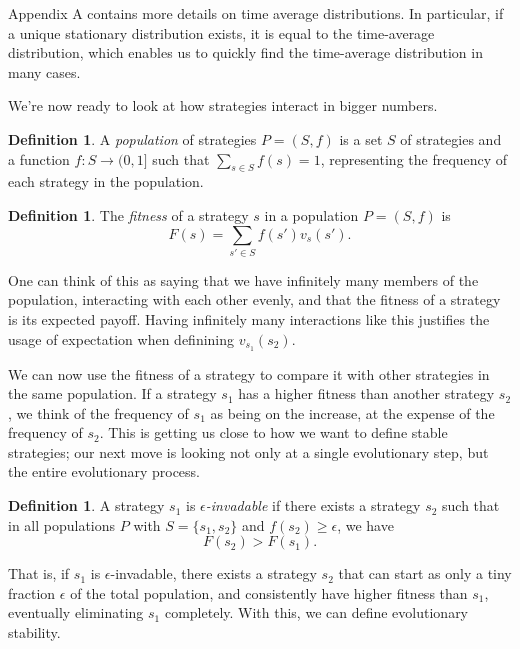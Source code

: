 \documentclass[12pt]{article}
\theoremstyle{definition}
\newtheorem{definition}[theorem]{Definition}
\theoremstyle{remark}
\begin{document}
Appendix A contains more details on time average distributions. In particular, if a unique stationary distribution exists, it is equal to the time-average distribution, which enables us to quickly find the time-average distribution in many cases.

\fi

We're now ready to look at how strategies interact in bigger numbers.

\begin{definition}
  A \textit{population} of strategies $P = (S, f)$ is a set $S$ of strategies and a function $f : S \to (0,1]$ such that $\sum_{s \in S} f(s) = 1$, representing the frequency of each strategy in the population.
\end{definition}

\begin{definition}
  The \textit{fitness} of a strategy $s$ in a population $P = (S, f)$ is \begin{equation*}
    F(s) = \sum_{s' \in S} f(s') v_s(s').
  \end{equation*}
\end{definition}

One can think of this as saying that we have infinitely many members of the population, interacting with each other evenly, and that the fitness of a strategy is its expected payoff. Having infinitely many interactions like this justifies the usage of expectation when definining $v_{s_1}(s_2)$.

We can now use the fitness of a strategy to compare it with other strategies in the same population. If a strategy $s_1$ has a higher fitness than another strategy $s_2$, we think of the frequency of $s_1$ as being on the increase, at the expense of the frequency of $s_2$. This is getting us close to how we want to define stable strategies; our next move is looking not only at a single evolutionary step, but the entire evolutionary process.

\begin{definition}
  A strategy $s_1$ is \textit{$\epsilon$-invadable} if there exists a strategy $s_2$ such that in all populations $P$ with $S = \{s_1,s_2\}$ and $f(s_2) \geq \epsilon$, we have 
  \begin{equation*}
    \label{fitnesscond}
    F(s_2) > F(s_1).
  \end{equation*}
\end{definition}

That is, if $s_1$ is $\epsilon$-invadable, there exists a strategy $s_2$ that can start as only a tiny fraction $\epsilon$ of the total population, and consistently have higher fitness than $s_1$, eventually eliminating $s_1$ completely. With this, we can define evolutionary stability.
\end{document}

